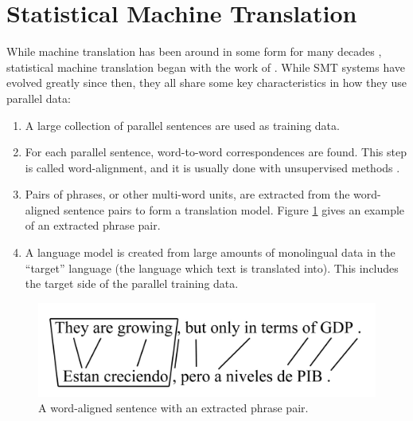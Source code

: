 \section{Statistical Machine Translation}
While machine translation has been around in some form for many decades
\citep{Locke55}, statistical machine translation began with the work of
\citet{Brown88,Brown90,Brown93}. While SMT systems have evolved greatly since
then, they all share some key characteristics in how they use parallel data:


\begin{enumerate}
\item A large collection of parallel sentences are used as training data.
\item For each parallel sentence, word-to-word correspondences are found. This
step is called word-alignment, and it is usually done with unsupervised methods
\citep{Brown93,Vogel96}.
\item Pairs of phrases, or other multi-word units, are extracted from the
word-aligned sentence pairs to form a translation model. Figure
\ref{fig:phrase_align} gives an example of an extracted phrase pair.
\item A language model is created from large amounts of monolingual data in the
``target'' language (the language which text is translated into). This includes
the target side of the parallel training data.
\end{enumerate}

\begin{figure}[ht]
\includegraphics[width=\textwidth]{images/phrase_align.jpg}
\caption{A word-aligned sentence with an extracted phrase pair.}
\label{fig:phrase_align}
\end{figure}

